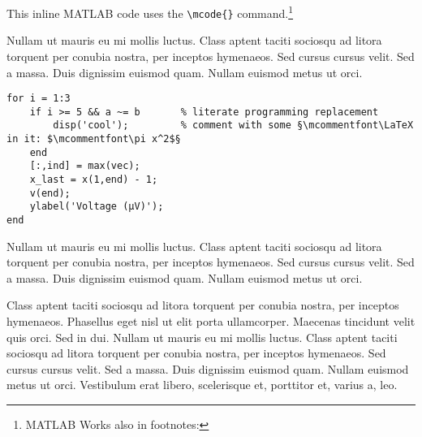This inline MATLAB code  uses the \verb|\mcode{}| command.\footnote{MATLAB Works also in footnotes: }

Nullam ut mauris eu mi mollis luctus. Class aptent taciti sociosqu ad litora torquent per conubia nostra, per inceptos hymenaeos. Sed cursus cursus velit. Sed a massa. Duis dignissim euismod quam. Nullam euismod metus ut orci.

\begin{lstlisting}[language=matlabfloz,caption={\mcode{Matlab Function}}]
for i = 1:3
	if i >= 5 && a ~= b       % literate programming replacement
		disp('cool');         % comment with some §\mcommentfont\LaTeX in it: $\mcommentfont\pi x^2$§
	end
	[:,ind] = max(vec);
	x_last = x(1,end) - 1;
	v(end);
	ylabel('Voltage (µV)');
end
\end{lstlisting}

Nullam ut mauris eu mi mollis luctus. Class aptent taciti sociosqu ad litora torquent per conubia nostra, per inceptos hymenaeos. Sed cursus cursus velit. Sed a massa. Duis dignissim euismod quam. Nullam euismod metus ut orci.



Class aptent taciti sociosqu ad litora torquent per conubia nostra, per inceptos hymenaeos. Phasellus eget nisl ut elit porta ullamcorper. Maecenas tincidunt velit quis orci. Sed in dui. Nullam ut mauris eu mi mollis luctus. Class aptent taciti sociosqu ad litora torquent per conubia nostra, per inceptos hymenaeos. Sed cursus cursus velit. Sed a massa. Duis dignissim euismod quam. Nullam euismod metus ut orci. Vestibulum erat libero, scelerisque et, porttitor et, varius a, leo.

